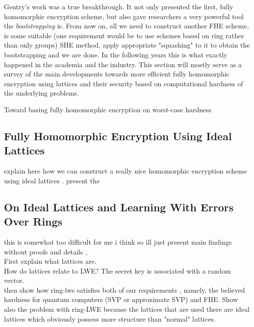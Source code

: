 Gentry's work was a true breakthrough. It not only presented the first, fully homomorphic encryption scheme, but also gave researchers a very powerful tool the \textit{bootstrapping} is. From now on, all we need to construct another FHE scheme, is some suitable (one requirement would be to use schemes based on ring rather than only groups) SHE method, apply appropriate "squashing" to it to obtain the bootstrapping and we are done. In the following years this is what exactly happened in the academia and the industry. This section will mostly serve as a survey of the main developments towards more efficient fully homomorphic encryption using lattices and their security based on computational hardness of the underlying problems.

Toward basing fully homomorphic encryption on worst-case hardness
\subsection{Fully Homomorphic Encryption Using Ideal Lattices}
explain here how we can construct a really nice homomorphic encryption scheme using ideal lattices \cite{gentry}. present the 
\subsection{On Ideal Lattices and Learning With Errors Over Rings}
this is somewhat too difficult for me i think so ill just present main findings without proofs and details \cite{regev}, \cite{ring-lwe} \\
First explain what lattices are. \\
How do lattices relate to LWE? The secret key is associated with a random vector. \\
then show how ring-lwe satisfies both of our requirements \cite{ring-lwe}, namely, the believed hardness for quantum computers (SVP or approximate SVP) and FHE. Show also the problem with ring-LWE because the lattices that are used there are ideal lattices which obviously possess more structure than "normal" lattices.